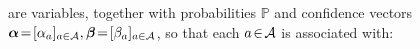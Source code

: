 \documentclass{article}
\newcommand\vjoe[1]{{\color{joecolor}\textbf{$\boldsymbol\{$Joe: }#1 \textbf{$\boldsymbol\}$}}}
\begin{document}
\begin{defn}
    are
    variables,
    together with 
    probabilities $\mathbb P$
    and
    confidence vectors
    $\boldsymbol\alpha \!=\! [\alpha_a]_{a \in \mathcal A},\boldsymbol\beta \!=\! [\beta_a]_{a \in \mathcal A}$,
    so that
    each $a \! \in\! \mathcal A$ is associated with:
    

\end{defn}
\end{document}

